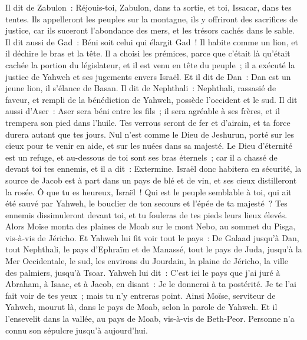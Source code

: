 \begin{multicols}{2}
Il dit de Zabulon~: Réjouis-toi, Zabulon, dans ta sortie, et toi, Issacar, dans tes tentes.
Ils appelleront les peuples sur la montagne, ils y offriront des sacrifices de justice, car ils suceront l'abondance des mers, et les trésors cachés dans le sable.
Il dit aussi de Gad~: Béni soit celui qui élargit Gad~! Il habite comme un lion, et il déchire le bras et la tête.
Il a choisi les prémices, parce que c'était là qu'était cachée la portion du législateur, et il est venu en tête du peuple~; il a exécuté la justice de Yahweh et ses jugements envers Israël.
Et il dit de Dan~: Dan est un jeune lion, il s'élance de Basan.
Il dit de Nephthali~: Nephthali, rassasié de faveur, et rempli de la bénédiction de Yahweh, possède l'occident et le sud.
Il dit aussi d'Aser~: Aser sera béni entre les fils~; il sera agréable à ses frères, et il trempera son pied dans l'huile.
Tes verrous seront de fer et d'airain, et ta force durera autant que tes jours.
Nul n'est comme le Dieu de Jeshurun, porté sur les cieux pour te venir en aide, et sur les nuées dans sa majesté.
Le Dieu d'éternité est un refuge, et au-dessous de toi sont ses bras éternels~; car il a chassé de devant toi tes ennemis, et il a dit~: Extermine.
Israël donc habitera en sécurité, la source de Jacob est à part dans un pays de blé et de vin, et ses cieux distilleront la rosée.
Ô que tu es heureux, Israël~! Qui est le peuple semblable à toi, qui ait été sauvé par Yahweh, le bouclier de ton secours et l'épée de ta majesté~? Tes ennemis dissimuleront devant toi, et tu fouleras de tes pieds leurs lieux élevés.
\VerseOne{}Alors Moïse monta des plaines de Moab sur le mont Nebo, au sommet du Pisga, vis-à-vis de Jéricho. Et Yahweh lui fit voir tout le pays~: De Galaad jusqu'à Dan,
tout Nephthali, le pays d'Ephraïm et de Manassé, tout le pays de Juda, jusqu'à la Mer Occidentale,
le sud, les environs du Jourdain, la plaine de Jéricho, la ville des palmiers, jusqu'à Tsoar.
Yahweh lui dit~: C'est ici le pays que j'ai juré à Abraham, à Isaac, et à Jacob, en disant~: Je le donnerai à ta postérité. Je te l'ai fait voir de tes yeux~; mais tu n'y entreras point.
Ainsi Moïse, serviteur de Yahweh, mourut là, dans le pays de Moab, selon la parole de Yahweh.
Et il l'ensevelit dans la vallée, au pays de Moab, vis-à-vis de Beth-Peor. Personne n'a connu son sépulcre jusqu'à aujourd'hui.

\end{multicols}
